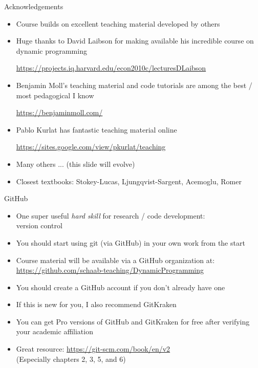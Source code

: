 \documentclass[10pt]{beamer}
\begin{document}
\begin{frame}{Acknowledgements}
\begin{itemize}
\item Course builds on excellent teaching material developed by others

\item Huge thanks to David Laibson for making available his incredible course on dynamic programming 

\url{https://projects.iq.harvard.edu/econ2010c/lecturesDLaibson}

\item Benjamin Moll's teaching material and code tutorials are among the best / most pedagogical I know

\url{https://benjaminmoll.com/}

\item Pablo Kurlat has fantastic teaching material online

\url{https://sites.google.com/view/pkurlat/teaching}

\item Many others ... (this slide will evolve)

\item Closest textbooks: Stokey-Lucas, Ljungqvist-Sargent, Acemoglu, Romer

\end{itemize}
\end{frame}


\begin{frame}{GitHub}
\begin{itemize}
\item One super useful \textit{hard skill} for research / code development: \\
version control

\item You should start using git (via GitHub) in your own work from the start

\item Course material will be available via a GitHub organization at:
\url{https://github.com/schaab-teaching/DynamicProgramming}

\item You should create a GitHub account if you don't already have one

\item If this is new for you, I also recommend GitKraken

\item You can get Pro versions of GitHub and GitKraken for free after verifying your academic affiliation

\item Great resource: \url{https://git-scm.com/book/en/v2} \\
(Especially chapters 2, 3, 5, and 6)

\end{itemize}
\end{frame}
\end{document}
